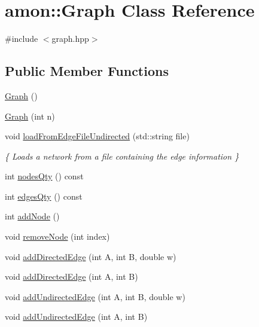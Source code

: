 \hypertarget{classamon_1_1_graph}{\section{amon\-:\-:Graph Class Reference}
\label{classamon_1_1_graph}
}


{\ttfamily \#include $<$graph.\-hpp$>$}

\subsection*{Public Member Functions}
\begin{DoxyCompactItemize}
\item 
\hyperlink{classamon_1_1_graph_a8dbd046ce57a0c624c7abe573b174ce1}{Graph} ()
\item 
\hyperlink{classamon_1_1_graph_a40dd78be5732f86fa3df8d687d0e5728}{Graph} (int n)
\item 
void \hyperlink{classamon_1_1_graph_a3fb78df14f92175270f5dec661fc37a2}{load\-From\-Edge\-File\-Undirected} (std\-::string file)
\begin{DoxyCompactList}\small\item\em \{ Loads a network from a file containing the edge information \} \end{DoxyCompactList}\item 
int \hyperlink{classamon_1_1_graph_a7c7ef2759921bb87aa8c69c28ea62f8f}{nodes\-Qty} () const 
\item 
int \hyperlink{classamon_1_1_graph_a705be004387c64a5ce5aa668b0c4e9d7}{edges\-Qty} () const 
\item 
int \hyperlink{classamon_1_1_graph_aa7f39dcf5b2fab62d0b9399bc759ff27}{add\-Node} ()
\item 
void \hyperlink{classamon_1_1_graph_af3a842a93c90db66a7f301c685e51b3a}{remove\-Node} (int index)
\item 
void \hyperlink{classamon_1_1_graph_a02016704b31a4bf3a277fb4fcb8c1d72}{add\-Directed\-Edge} (int A, int B, double w)
\item 
void \hyperlink{classamon_1_1_graph_ae7e1e36c734c6085ecc4e733e7428b97}{add\-Directed\-Edge} (int A, int B)
\item 
void \hyperlink{classamon_1_1_graph_a98b71efc14d469813b8d1c679ca22fa3}{add\-Undirected\-Edge} (int A, int B, double w)
\item 
void \hyperlink{classamon_1_1_graph_a5b9260a41af2a7c15acd0cba2976c0c3}{add\-Undirected\-Edge} (int A, int B)
\item 

\end{DoxyCompactItemize}
